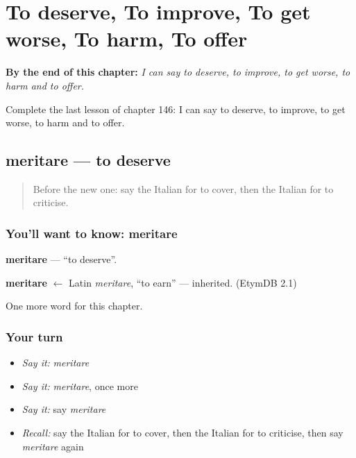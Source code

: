 
\chapter{To deserve, To improve, To get worse, To harm, To offer}
\label{ch:it-to-deserve-to-improve-to-get-worse-to-harm-to-offer}

\begin{chapteropening}
\textbf{By the end of this chapter:} \emph{I can say to deserve, to improve, to get worse, to harm and to offer.}

Complete the last lesson of chapter 146: I can say to deserve, to improve, to get worse, to harm and to offer.
\end{chapteropening}

\section[meritare]{meritare — to deserve}

\label{lesson:IT-C146-meritare}



\begin{quote}
Before the new one: say the Italian for to cover, then the Italian for to criticise.
\end{quote}

\subsection*{You'll want to know: meritare}
\textbf{meritare} — \textquotedblleft{}to deserve\textquotedblright{}.

\begin{cousinweb}
\textbf{meritare} $\leftarrow$ Latin \emph{meritare}, \textquotedblleft{}to earn\textquotedblright{} — inherited. (EtymDB 2.1)
\end{cousinweb}

\begin{grammarlens}[title={What you've built}]
One more word for this chapter.
\end{grammarlens}

\subsection*{Your turn}
\begin{itemize}
\raggedright
  \item \emph{Say it:} \emph{meritare}
  \item \emph{Say it:} \emph{meritare}, once more
  \item \emph{Say it:} say \emph{meritare}
  \item \emph{Recall:} say the Italian for to cover, then the Italian for to criticise, then say \emph{meritare} again
\end{itemize}

